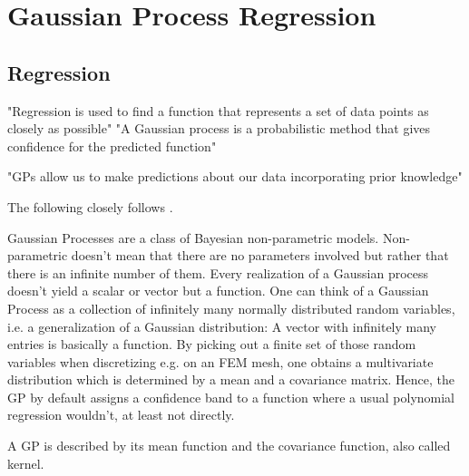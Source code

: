 \documentclass[%
  a4paper,oneside,%
  11pt,%
  smallchapters,
  green,%
  rgb, <cmyk>
  ]{tubsbook}
\begin{document}
\section{Gaussian Process Regression}

\subsection{Regression}
"Regression is used to find a function that represents a set of data points as closely as possible" \cite{gortler2019}
\cite{gortler2019} "A Gaussian process is a probabilistic method that gives confidence for the predicted function"

"GPs allow us to make predictions about our data incorporating prior knowledge"



The following closely follows \cite{rasmussen2006}.


Gaussian Processes are a class of Bayesian non-parametric models. Non-parametric doesn't mean that there are no parameters involved but rather that there is an infinite number of them. Every realization of a Gaussian process doesn't yield a scalar or vector but a function. One can think of a Gaussian Process as a collection of infinitely many normally distributed random variables, i.e. a generalization of a Gaussian distribution: A vector with infinitely many entries is basically a function. By picking out a finite set of those random variables when discretizing e.g. on an FEM mesh, one obtains a multivariate distribution which is determined by a mean and a covariance matrix. \cite[p. 2]{rasmussen2006} Hence, the GP by default assigns a confidence band to a function where a usual polynomial regression wouldn't, at least not directly.

A GP is described by its mean function and the covariance function, also called kernel.
\end{document}
